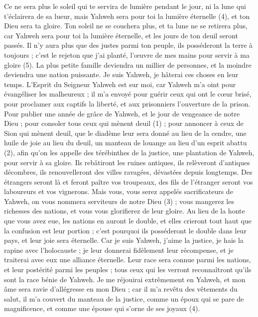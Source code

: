 \begin{multicols}{2}
{Ce ne sera plus le soleil qui te servira de lumière pendant le jour, ni la lune qui t’éclairera de sa lueur, mais Yahweh sera pour toi la lumière éternelle (4), et ton Dieu sera ta gloire.
Ton soleil ne se couchera plus, et ta lune ne se retirera plus, car Yahweh sera pour toi la lumière éternelle, et les jours de ton deuil seront passés.
Il n’y aura plus que des justes parmi ton peuple, ils posséderont la terre à toujours ; c’est le rejeton que j’ai planté, l’œuvre de mes mains pour servir à ma gloire (5).
La plus petite famille deviendra un millier de personnes, et la moindre deviendra une nation puissante. Je suis Yahweh, je hâterai ces choses en leur temps.
\VerseOne{}L'Esprit du Seigneur Yahweh est sur moi, car Yahweh m'a oint pour évangéliser les malheureux ; il m'a envoyé pour guérir ceux qui ont le cœur brisé, pour proclamer aux captifs la liberté, et aux prisonniers l'ouverture de la prison.
Pour publier une année de grâce de Yahweh, et le jour de vengeance de notre Dieu ; pour consoler tous ceux qui mènent deuil (1) ;
pour annoncer à ceux de Sion qui mènent deuil, que le diadème leur sera donné au lieu de la cendre, une huile de joie au lieu du deuil, un manteau de louange au lieu d’un esprit abattu (2), afin qu’on les appelle des térébinthes de la justice, une plantation de Yahweh, pour servir à sa gloire.
Ils rebâtiront les ruines antiques, ils relèveront d’antiques décombres, ils renouvelleront des villes ravagées, dévastées depuis longtemps.
Des étrangers seront là et feront paître vos troupeaux, des fils de l’étranger seront vos laboureurs et vos vignerons.
Mais vous, vous serez appelés sacrificateurs de Yahweh, on vous nommera serviteurs de notre Dieu (3) ; vous mangerez les richesses des nations, et vous vous glorifierez de leur gloire.
Au lieu de la honte que vous avez eue, les nations en auront le double, et elles crieront tout haut que la confusion est leur portion ; c'est pourquoi ils posséderont le double dans leur pays, et leur joie sera éternelle.
Car je suis Yahweh, j’aime la justice, je hais la rapine avec l'holocauste ; je leur donnerai fidèlement leur récompense, et je traiterai avec eux une alliance éternelle.
Leur race sera connue parmi les nations, et leur postérité parmi les peuples ; tous ceux qui les verront reconnaîtront qu'ils sont la race bénie de Yahweh.
Je me réjouirai extrêmement en Yahweh, et mon âme sera ravie d’allégresse en mon Dieu ; car il m'a revêtu des vêtements du salut, il m'a couvert du manteau de la justice, comme un époux qui se pare de magnificence, et comme une épouse qui s'orne de ses joyaux (4).
}
\end{multicols}
